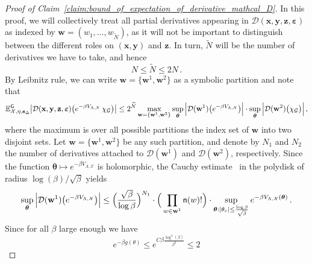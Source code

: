 \documentclass[11pt]{article}
\theoremstyle{definition}
\theoremstyle{remark}
\numberwithin{theorem}{section}
\def\eps{{\varepsilon}}
\def\La{{\Lambda}}
\newcommand{\bE}{\mathbb E}
\begin{document}
    \begin{proof}[Proof of Claim~\ref{claim:bound_of_expectation_of_derivative_mathcal_D}]
        In this proof, we will collectively treat all partial derivatives appearing in $\mathcal{D}(\mathbf{x}, \mathbf{y}, \mathbf{z} , \boldsymbol{\eps})$ as indexed by $\mathbf{w} = (w_1,\ldots,w_{\widetilde N})$, as it will not be important to distinguish between the different roles on $(\mathbf{x},\mathbf{y})$ and $\mathbf{z}$. In turn, $\widetilde{N}$ will be the number of derivatives we have to take, and hence
        \[
        N \le \widetilde N\le 2N \, .
        \]
        By Leibnitz rule, we can write $\mathbf{w} = \{ \mathbf{w}^1,\mathbf{w}^2\}$ as a symbolic partition and note that
        \begin{equation} \label{eq:proof_of_claim:bound_of_expectation_of_derivative_mathcal_D_after_leibnitz}
            \bE_{\mathcal{X},\eta,\mathbf{s}_{\Delta}}^{\sf G} \big|\mathcal{D}(\mathbf{x},\mathbf{y},\mathbf{z}, \boldsymbol{\eps} ) \big(e^{-\beta V_{\La,\mathcal{X}}} \, \chi_{\mathcal{G}} \big)\big| \le 2^{\widetilde{N}} \max_{\mathbf{w} = \{ \mathbf{w}^1,\mathbf{w}^2\}} \sup_{\boldsymbol{\theta}} \Big|\mathcal{D} (\mathbf{w}^1) \big(e^{-\beta V_{\La,\mathcal{X}}} \big) \Big| \cdot \sup_{\boldsymbol{\theta}} \Big|\mathcal{D} (\mathbf{w}^2) \big(\chi_{\mathcal{G}} \big) \Big| \, , 
        \end{equation}
        where the maximum is over all possible partitions the index set of $\mathbf{w}$ into two disjoint sets. Let $\mathbf{w} = \{ \mathbf{w}^1,\mathbf{w}^2\}$ be any such partition, and denote by $N_1$ and $N_2$ the number of derivatives attached to $\mathcal{D}(\mathbf{w}^1)$ and $\mathcal{D}(\mathbf{w}^2)$, respectively. Since the function $\mathbf{\theta} \mapsto e^{-\beta V_{\La,\mathcal{X}}}$ is holomorphic, the Cauchy estimate~\cite[Theorem~2.2.7]{Hormander-SeveralComplexVariables} in the polydisk of radius $\log(\beta)/\sqrt{\beta}$ yields
        \begin{equation*}
            \sup_{\boldsymbol{\theta}} \Big|\mathcal{D} (\mathbf{w}^1) \big(e^{-\beta V_{\La,\mathcal{X}}} \big) \Big| \le \Big(\frac{\sqrt{\beta}}{\log \beta} \Big)^{N_1} \cdot \Big( \prod_{w\in \mathbf{w}^1} {\sf n}(w)! \Big) \cdot  \sup_{\boldsymbol{\theta}: |\theta_e| \le \frac{\log \beta}{\sqrt{\beta}}}e^{-\beta V_{\La,\mathcal{X}} (\boldsymbol{\theta})}  \, .
        \end{equation*}
        Since for all $\beta$ large enough we have
        \[
        e^{ - \beta g(\theta)  } \le e^{ C \beta \frac{\log^4(\beta)}{\beta^2}} \le 2
\]
\end{proof}
\end{document}
